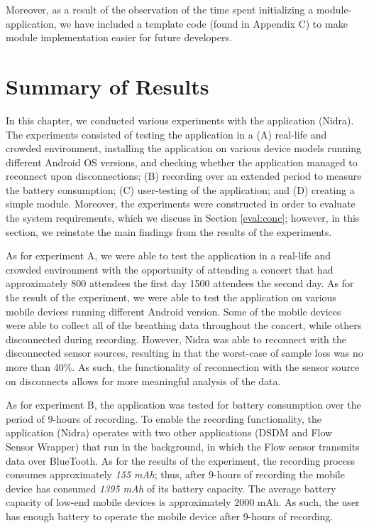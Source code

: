 Moreover, as a result of the observation of the time spent initializing a module-application, we have included a template code (found in Appendix C) to make module implementation easier for future developers. 




\section{Summary of Results}

In this chapter, we conducted various experiments with the application (Nidra). The experiments consisted of testing the application in a (A) real-life and crowded environment, installing the application on various device models running different Android OS versions, and checking whether the application managed to reconnect upon disconnections; (B) recording over an extended period to measure the battery consumption; (C) user-testing of the application; and (D) creating a simple module. Moreover, the experiments were constructed in order to evaluate the system requirements, which we discuss in Section \ref{eval:conc}; however, in this section, we reinstate the main findings from the results of the experiments.

As for experiment A, we were able to test the application in a real-life and crowded environment with the opportunity of attending a concert that had approximately 800 attendees the first day 1500 attendees the second day. As for the result of the experiment, we were able to test the application on various mobile devices running different Android version. Some of the mobile devices were able to collect all of the breathing data throughout the concert, while others disconnected during recording. However, Nidra was able to reconnect with the disconnected sensor sources, resulting in that the worst-case of sample loss was no more than 40\%. As such, the functionality of reconnection with the sensor source on disconnects allows for more meaningful analysis of the data.

As for experiment B, the application was tested for battery consumption over the period of 9-hours of recording. To enable the recording functionality, the application (Nidra) operates with two other applications (DSDM and Flow Sensor Wrapper) that run in the background, in which the Flow sensor transmits data over BlueTooth. As for the results of the experiment, the recording process consumes approximately \textit{155 mAh}; thus, after 9-hours of recording the mobile device has consumed \textit{1395 mAh} of its battery capacity. The average battery capacity of low-end mobile devices is approximately 2000 mAh. As such, the user has enough battery to operate the mobile device after 9-hours of recording. 

